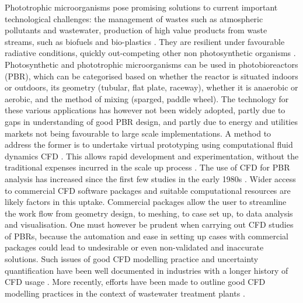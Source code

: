 Phototrophic microorganisms pose promising solutions to current important technological challenges: the management of wastes such as atmospheric pollutants and wastewater, production of high value products from waste streams, such as biofuels and bio-plastics \cite{hulsen2016}. They are resilient under favourable radiative conditions, quickly out-competing other non photosynthetic organisms \cite{posten2009}. Photosynthetic and phototrophic microorganisms can be used in photobioreactors (PBR), which can be categorised based on whether the reactor is situated indoors or outdoors, its geometry (tubular, flat plate, raceway), whether it is anaerobic or aerobic, and the method of mixing (sparged, paddle wheel). The technology for these various applications has however not been widely adopted, partly due to gaps in understanding of good PBR design, and partly due to energy and utilities markets not being favourable to large scale implementations. A method to address the former is to undertake virtual prototyping using computational fluid dynamics CFD \cite{bitog2011}. This allows rapid development and experimentation, without the traditional expenses incurred in the scale up process \cite{bridgeman2012}.
\skippingparagraph
The use of CFD for PBR analysis has increased since the first few studies in the early 1980s \cite{patankar1980}. Wider access to commercial CFD software packages and suitable computational resources are likely factors in this uptake. Commercial packages allow the user to streamline the work flow from geometry design, to meshing, to case set up, to data analysis and visualisation. One must however be prudent when carrying out CFD studies of PBRs, because the automation and ease in setting up cases with commercial packages could lead to undesirable or even non-validated and inaccurate solutions. Such issues of good CFD modelling practice and uncertainty quantification have been well documented in industries with a longer history of CFD usage \cite{roache2002,oberkampf2002,celik2008,pelletier2010}.  More recently, efforts have been made to outline good CFD modelling practices in the context of wastewater treatment plants \cite{wicklein2016}.
\skippingparagraph

